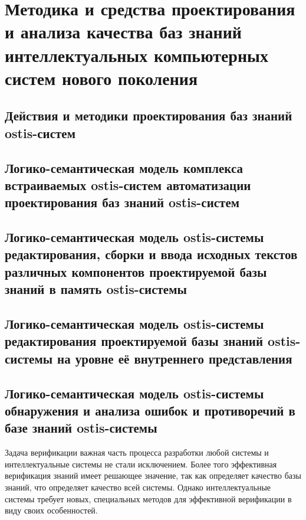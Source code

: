 \chapter{Методика и средства проектирования и анализа качества баз знаний интеллектуальных компьютерных систем нового поколения}
\label{chapter_kb_design}


\section{Действия и методики проектирования баз знаний ostis-систем}
\section{Логико-семантическая модель комплекса встраиваемых ostis-систем автоматизации проектирования баз знаний ostis-систем}
\section{Логико-семантическая модель ostis-системы редактирования, сборки и ввода исходных текстов различных компонентов проектируемой базы знаний в память ostis-системы}
\section{Логико-семантическая модель ostis-системы редактирования проектируемой базы знаний ostis-системы на уровне её внутреннего представления}
\section{Логико-семантическая модель ostis-системы обнаружения и анализа ошибок и противоречий в базе знаний ostis-системы}

Задача верификации важная часть процесса разработки любой системы и интеллектуальные системы не стали исключением. Более того эффективная верификация знаний имеет решающее значение, так как определяет качество базы знаний, что определяет качество всей системы. Однако интеллектуальные системы требует новых, специальных методов для эффективной верификации в виду своих особенностей.

